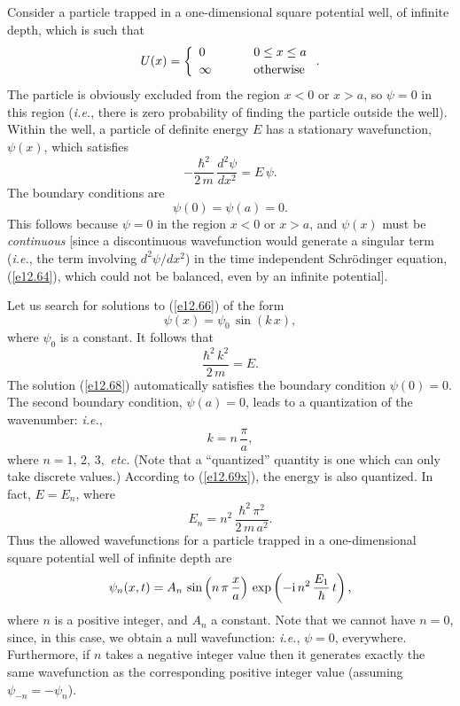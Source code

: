 Consider a particle trapped in a one-dimensional square potential well, of infinite depth, which is such that
\begin{equation}
U(x) = \left\{
\begin{array}{lll}
0&\mbox{\hspace{0.5cm}}&0\leq x \leq a\\[0.5ex]
\infty &&\mbox{otherwise}
\end{array}\right..
\end{equation}
The particle is obviously excluded from the region $x<0$ or $x>a$, so $\psi=0$ in this region ({\em i.e.}, there
is zero probability of finding the particle outside the well). Within the  well, a particle
of definite energy $E$ has a stationary wavefunction, $\psi(x)$,  which satisfies
\begin{equation}\label{e12.66}
-\frac{\hbar^2}{2\,m}\,\frac{d^2\psi}{d x^2}  = E\,\psi.
\end{equation}
The boundary conditions are
\begin{equation}\label{e12.67}
\psi(0) = \psi(a) = 0.
\end{equation}
This follows because $\psi=0$ in the region $x<0$ or $x>a$, and $\psi(x)$ must be {\em continuous}\/ [since a discontinuous
wavefunction would generate a singular term ({\em i.e.}, the term involving $d^2\psi/dx^2$) in the time independent Schr\"{o}dinger equation, (\ref{e12.64}),
which could not be balanced, even by an infinite potential]. 

Let us search for solutions to (\ref{e12.66}) of the form
\begin{equation}\label{e12.68}
\psi(x) = \psi_0\,\sin(k\,x),
\end{equation}
where $\psi_0$ is a constant. It follows that
\begin{equation}\label{e12.69x}
\frac{\hbar^2\,k^2}{2\,m} = E.
\end{equation}
The solution (\ref{e12.68}) automatically satisfies the boundary condition $\psi(0)=0$. The second boundary
condition, $\psi(a)=0$, leads to a quantization of the wavenumber: {\em i.e.}, 
\begin{equation}\label{e12.69}
k= n\,\frac{\pi}{a},
\end{equation}
where $n=1,\,2,\,3,$  {\em etc.} (Note that a ``quantized'' quantity is one which can only take discrete values.) According to (\ref{e12.69x}), the energy is also quantized.
In fact, $E=E_n$, where 
\begin{equation}
E_n = n^2\,\frac{\hbar^2\,\pi^2}{2\,m\,a^2}.
\end{equation}
Thus the allowed wavefunctions for a particle  trapped in a one-dimensional square potential well of infinite depth are
\begin{equation}\label{e12.72}
\psi_n(x,t) = A_n\,\sin\left(n\,\pi\,\frac{x}{a}\right)\,\exp\left(-{\rm i}\,n^2\,\frac{E_1}{\hbar}\,t\right),
\end{equation}
where $n$ is a positive integer, and $A_n$ a constant. Note that we cannot have $n=0$, since, in this case, we obtain
a null wavefunction: {\em i.e.}, $\psi=0$, everywhere. Furthermore, if $n$ takes a negative integer value
then it generates exactly the same wavefunction as the corresponding positive integer value  (assuming $\psi_{-n}=-\psi_n$). 

